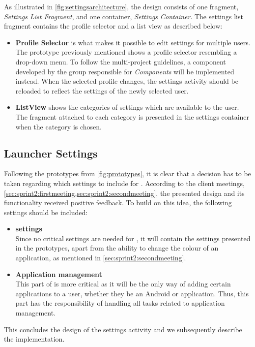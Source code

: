 As illustrated in \cref{fig:settingsarchitecture}, the design consists of one fragment, \textit{Settings List Fragment}, and one container, \textit{Settings Container}.
The settings list fragment contains the profile selector and a list view as described below:
\begin{itemize}
\item \textbf{Profile Selector} is what makes it possible to edit settings for multiple users.
The prototype previously mentioned shows a profile selector resembling a drop-down menu.
To follow the multi-project guidelines, a component developed by the group responsible for \textit{\giraf Components} will be implemented instead.
When the selected profile changes, the settings activity should be reloaded to reflect the settings of the newly selected user.
\item \textbf{ListView} shows the categories of settings which are available to the user.
The fragment attached to each category is presented in the settings container when the category is chosen.
\end{itemize}

\subsection{Launcher Settings}\label{sec:launchersettings}
Following the prototypes from \cref{fig:prototypes}, it is clear that a decision has to be taken regarding which settings to include for \launcher.
According to the client meetings, \cref{sec:sprint2:firstmeeting,sec:sprint2:secondmeeting}, the presented design and its functionality received positive feedback.
To build on this idea, the following settings should be included:

\begin{itemize}
\item \textbf{\launcher settings}\\
Since no critical settings are needed for \launcher, it will contain the settings presented in the prototypes, apart from the ability to change the colour of an application, as mentioned in \cref{sec:sprint2:secondmeeting}.
\item \textbf{Application management}\\
This part of \launcher is more critical as it will be the only way of adding certain applications to a user, whether they be an Android or \giraf application.
Thus, this part has the responsibility of handling all tasks related to application management.
\end{itemize}

This concludes the design of the settings activity and we subsequently describe the implementation.